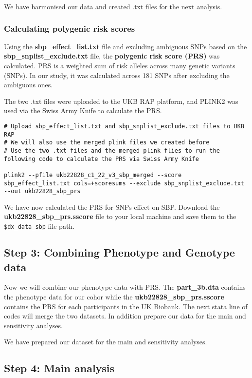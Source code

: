 \documentclass[11pt]{article}
\begin{document}
We have harmonised our data and created .txt files for the next analysis. 

\subsubsection{Calculating polygenic risk scores}

Using the \textbf{sbp\_effect\_list.txt} file and excluding ambiguous SNPs based on the \textbf{sbp\_snplist\_exclude.txt} file, the \textbf{polygenic risk score (PRS)} was calculated. PRS is a weighted sum of risk alleles across many genetic variants (SNPs). In our study, it was calculated across 181 SNPs after excluding the ambiguous ones.

The two .txt files were uploaded to the UKB RAP platform, and PLINK2 was used via the Swiss Army Knife to calculate the PRS.
\begin{lstlisting}[style=BashStyle]
# Upload sbp_effect_list.txt and sbp_snplist_exclude.txt files to UKB RAP
# We will also use the merged plink files we created before 
# Use the two .txt files and the merged plink flies to run the following code to calculate the PRS via Swiss Army Knife 

plink2 --pfile ukb22828_c1_22_v3_sbp_merged --score sbp_effect_list.txt cols=+scoresums --exclude sbp_snplist_exclude.txt --out ukb22828_sbp_prs

\end{lstlisting}
We have now calculated the PRS for SNPs effect on SBP. Download the \textbf{ukb22828\_sbp\_prs.sscore} file to your local machine and save them to the \texttt{\$dx\_data\_sbp} file path.
\newpage
\subsection{Step 3: Combining Phenotype and Genotype data}

Now we will combine our phenotype data with PRS. The \textbf{part\_3b.dta} contains the phenotype data for our cohor while the \textbf{ukb22828\_sbp\_prs.sscore} contains the PRS for each participants in the UK Biobank. The next stata line of codes will merge the two datasets. In addition prepare our data for the main and sensitivity analyses. 
\color{violet}
\begin{stlog}\end{stlog}
\color{black}
We have prepared our dataset for the main and sensitivity analyses. 
\newpage
\subsection{Step 4: Main analysis}
\end{document}
